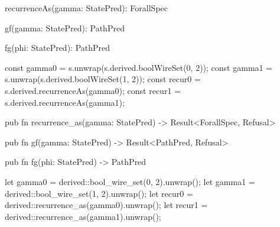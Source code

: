 \begin{tssrc}
recurrenceAs(gamma: StatePred): ForallSpec

gf(gamma: StatePred): PathPred

fg(phi: StatePred): PathPred
\end{tssrc}
\begin{tssrc}
const gamma0 = s.unwrap(s.derived.boolWireSet(0, 2));
const gamma1 = s.unwrap(s.derived.boolWireSet(1, 2));
const recur0 = s.derived.recurrenceAs(gamma0);
const recur1 = s.derived.recurrenceAs(gamma1);
\end{tssrc}
\begin{rustsrc}
pub fn recurrence_as(gamma: StatePred) -> Result<ForallSpec, Refusal>

pub fn gf(gamma: StatePred) -> Result<PathPred, Refusal>

pub fn fg(phi: StatePred) -> PathPred
\end{rustsrc}
\begin{rustsrc}
let gamma0 = derived::bool_wire_set(0, 2).unwrap();
let gamma1 = derived::bool_wire_set(1, 2).unwrap();
let recur0 = derived::recurrence_as(gamma0).unwrap();
let recur1 = derived::recurrence_as(gamma1).unwrap();
\end{rustsrc}
